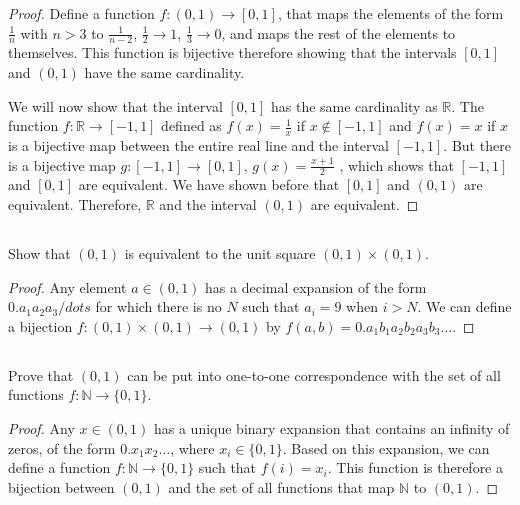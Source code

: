 \begin{proof}

Define a function $f:(0,1) \rightarrow [0,1]$, that maps the elements of the form $\frac{1}{n}$ with $n>3$ to $\frac{1}{n-2}$, $\frac{1}{2} \rightarrow 1$, $\frac{1}{3} \rightarrow 0$, and maps the rest of the elements to themselves. This function is bijective therefore showing that the intervals $[0,1]$ and $(0,1)$ have the same cardinality.

We will now show that the interval $[0,1]$ has the same cardinality as $\mathbb{R}$. The function $f:\mathbb{R} \rightarrow [-1,1]$ defined as $f(x) = \frac{1}{x}$ if $x \notin [-1,1]$ and $f(x) = x$ if $x$ is a bijective map between the entire real line and the interval $[-1, 1]$. But there is a bijective map $g:[-1, 1] \rightarrow [0,1]$, $g(x) = \frac{x+1}{2}$ , which shows that $[-1, 1]$ and $[0,1]$ are equivalent. We have shown before that $[0,1]$ and $(0,1)$ are equivalent. Therefore, $\mathbb{R}$ and the interval $(0,1)$ are equivalent.

\end{proof}

\subsection{} Show that $(0, 1)$ is equivalent to the unit square $(0, 1) \times (0, 1)$.

\begin{proof}

Any element $a \in (0,1)$ has a decimal expansion of the form $0.a_1a_2a_3/dots$ for which there is no $N$ such that $a_i=9$ when $i>N$. We can define a bijection $f:(0,1) \times (0,1) \rightarrow (0,1)$ by $f(a,b) = 0.a_1b_1a_2b_2a_3b_3\dots$.

\end{proof}


\subsection{} Prove that $(0, 1)$ can be put into one-to-one correspondence with the set of all functions $f : \mathbb{N} \rightarrow \{0,1\}$.

\begin{proof}

Any $x \in (0,1)$ has a unique binary expansion that contains an infinity of zeros, of the form $0.x_1x_2\dots$, where $x_i \in \{0,1\}$. Based on this expansion, we can define a function $f: \mathbb{N} \rightarrow \{0,1\}$ such that $f(i) = x_i$. This function is therefore a bijection between $(0,1)$ and the set of all functions that map $\mathbb{N}$ to $(0,1)$.

\end{proof}


